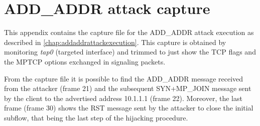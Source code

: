 \chapter{ADD\_ADDR attack capture}
\label{app:a}

This appendix contains the capture file for the ADD\_ADDR attack execution as described in \autoref{chap:addaddrattackexecution}. This capture is obtained by monitoring \textit{tap0} (targeted interface) and trimmed to just show the TCP flags and the MPTCP options exchanged in signaling packets.

From the capture file it is possible to find the ADD\_ADDR message received from the attacker (frame 21) and the subsequent SYN+MP\_JOIN message sent by the client to the advertised address 10.1.1.1 (frame 22). Moreover, the last frame (frame 30) shows the RST message sent by the attacker to close the initial subflow, that being the last step of the hijacking procedure.

